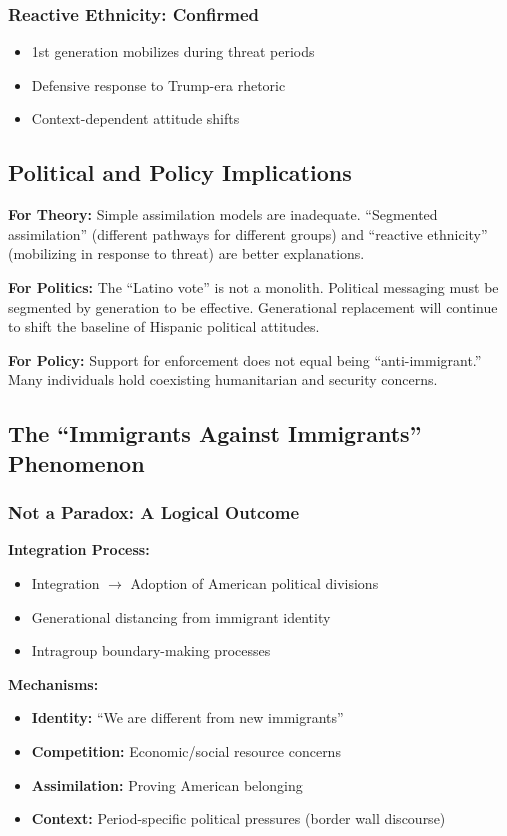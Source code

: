 \documentclass[11pt,letterpaper]{article}
\begin{document}
\subsubsection{Reactive Ethnicity: Confirmed}
\begin{itemize}
    \item 1st generation mobilizes during threat periods
    \item Defensive response to Trump-era rhetoric
    \item Context-dependent attitude shifts
\end{itemize}

\subsection{Political and Policy Implications}

\textbf{For Theory:} Simple assimilation models are inadequate. ``Segmented assimilation'' (different pathways for different groups) and ``reactive ethnicity'' (mobilizing in response to threat) are better explanations.

\textbf{For Politics:} The ``Latino vote'' is not a monolith. Political messaging must be segmented by generation to be effective. Generational replacement will continue to shift the baseline of Hispanic political attitudes.

\textbf{For Policy:} Support for enforcement does not equal being ``anti-immigrant.'' Many individuals hold coexisting humanitarian and security concerns.

\subsection{The ``Immigrants Against Immigrants'' Phenomenon}

\subsubsection{Not a Paradox: A Logical Outcome}

\textbf{Integration Process:}
\begin{itemize}
    \item Integration $\rightarrow$ Adoption of American political divisions
    \item Generational distancing from immigrant identity
    \item Intragroup boundary-making processes
\end{itemize}

\textbf{Mechanisms:}
\begin{itemize}
    \item \textbf{Identity:} ``We are different from new immigrants''
    \item \textbf{Competition:} Economic/social resource concerns
    \item \textbf{Assimilation:} Proving American belonging
    \item \textbf{Context:} Period-specific political pressures (border wall discourse)
\end{itemize}
\end{document}
